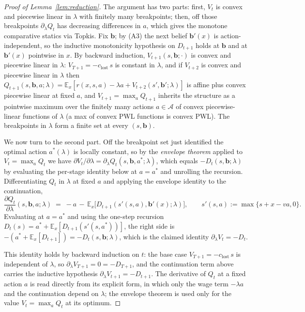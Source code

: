 \documentclass[preprint,11pt,authoryear]{elsarticle}
\newcommand{\bvec}[1]{\mathbf{#1}}
\theoremstyle{remark}
\begin{document}
\begin{proof}[Proof of Lemma~\ref{lem:reduction}]
The argument has two parts: first, $V_t$ is convex and piecewise linear in $\lambda$ with finitely many breakpoints; then, off those breakpoints $\partial_\lambda Q_t$ has decreasing differences in $a$, which gives the monotone comparative statics via Topkis. Fix $\bvec{b}$; by (A3) the next belief $\bvec{b}'(x)$ is action-independent, so the inductive monotonicity hypothesis on $D_{t+1}$ holds at $\bvec{b}$ and at $\bvec{b}'(x)$ pointwise in $x$. By backward induction, $V_{t+1}(s, \bvec{b}; \cdot)$ is convex and piecewise linear in $\lambda$: $V_{T+1} = -c_{\mathrm{lost}}\,s$ is constant in $\lambda$, and if $V_{t+2}$ is convex and piecewise linear in $\lambda$ then $Q_{t+1}(s, \bvec{b}, a; \lambda) = \mathbb{E}_x[r(x,s,a) - \lambda a + V_{t+2}(s', \bvec{b}'; \lambda)]$ is affine plus convex piecewise linear at fixed $a$, and $V_{t+1} = \max_a Q_{t+1}$ inherits the structure as a pointwise maximum over the finitely many actions $a\in\mathcal{A}$ of convex piecewise-linear functions of $\lambda$ (a max of convex PWL functions is convex PWL). The breakpoints in $\lambda$ form a finite set at every $(s, \bvec{b})$.

We now turn to the second part. Off the breakpoint set just identified the optimal action $a^*(\lambda)$ is locally constant, so by the \textit{envelope theorem} \citep{MilgromSegal2002} applied to $V_t=\max_a Q_t$ we have $\partial V_t/\partial\lambda=\partial_\lambda Q_t(s,\bvec{b},a^*;\lambda)$, which equals $-D_t(s,\bvec{b};\lambda)$ by evaluating the per-stage identity below at $a=a^*$ and unrolling the recursion. Differentiating $Q_t$ in $\lambda$ at fixed $a$ and applying the envelope identity to the continuation,
\[
\frac{\partial Q_t}{\partial \lambda}(s, \bvec{b}, a; \lambda) \;=\; -a \,-\, \mathbb{E}_x\bigl[D_{t+1}(s'(s,a), \bvec{b}'(x); \lambda)\bigr], \qquad s'(s,a) := \max\{s+x-va, 0\}.
\]
Evaluating at $a = a^*$ and using the one-step recursion $D_t(s) = a^* + \mathbb{E}_x[D_{t+1}(s'(s,a^*))]$, the right side is $-(a^* + \mathbb{E}_x[D_{t+1}]) = -D_t(s, \bvec{b}; \lambda)$, which is the claimed identity $\partial_\lambda V_t = -D_t$.

This identity holds by backward induction on $t$: the base case $V_{T+1} = -c_{\mathrm{lost}}\,s$ is independent of $\lambda$, so $\partial_\lambda V_{T+1} = 0 = -D_{T+1}$, and the continuation term above carries the inductive hypothesis $\partial_\lambda V_{t+1} = -D_{t+1}$. The derivative of $Q_t$ at a fixed action $a$ is read directly from its explicit form, in which only the wage term $-\lambda a$ and the continuation depend on $\lambda$; the envelope theorem is used only for the value $V_t = \max_a Q_t$ at its optimum.


\end{proof}
\end{document}

